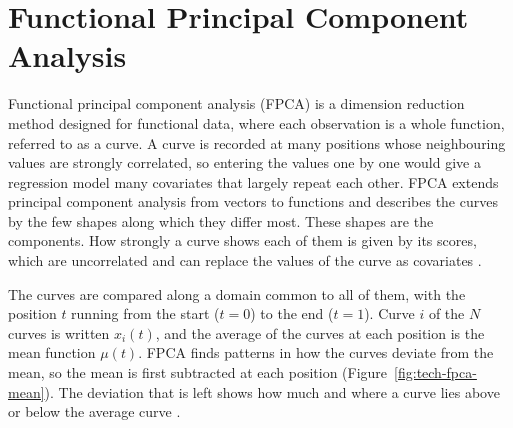 
\section{Functional Principal Component Analysis}
\label{sec:tech-fpca}

Functional principal component analysis (FPCA) is a dimension reduction method designed for functional data, where each observation is a whole function, referred to as a curve.
A curve is recorded at many positions whose neighbouring values are strongly correlated, so entering the values one by one would give a regression model many covariates that largely repeat each other.
FPCA extends principal component analysis from vectors to functions and describes the curves by the few shapes along which they differ most.
These shapes are the components.
How strongly a curve shows each of them is given by its scores, which are uncorrelated and can replace the values of the curve as covariates \cite{wang2016fda}.

\label{sec:tech-fpca-components}%
The curves are compared along a domain common to all of them, with the position $t$ running from the start ($t = 0$) to the end ($t = 1$).
Curve $i$ of the $N$ curves is written $x_i(t)$, and the average of the curves at each position is the mean function $\mu(t)$.
FPCA finds patterns in how the curves deviate from the mean, so the mean is first subtracted at each position (Figure~\ref{fig:tech-fpca-mean}).
The deviation that is left shows how much and where a curve lies above or below the average curve \cite{hershjmpfpca}.

